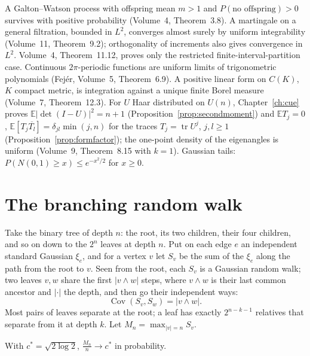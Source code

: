 \begin{reminder}
A Galton--Watson process with offspring mean $m>1$ and $P(\text{no offspring})>0$ survives with positive probability (Volume~4, Theorem~3.8). A martingale on a general filtration, bounded in $L^2$, converges almost surely by uniform integrability (Volume~11, Theorem~9.2); orthogonality of increments also gives convergence in $L^2$. Volume~4, Theorem~11.12, proves only the restricted finite-interval-partition case.
Continuous $2\pi$-periodic functions are uniform limits of trigonometric polynomials (Fej\'er, Volume~5, Theorem~6.9). A positive linear form on $C(K)$, $K$ compact metric, is integration against a unique finite Borel measure
(Volume~7, Theorem~12.3). For $U$ Haar distributed on $U(n)$, Chapter~\ref{ch:cue} proves $\mathbb E|\det(I-U)|^2=n+1$ (Proposition~\ref{prop:secondmoment}) and $\mathbb ET_j=0$, $\mathbb E[T_j\overline{T_l}]=\delta_{jl}\min(j,n)$ for the traces $T_j=\operatorname{tr}U^j$, $j,l\ge1$ (Proposition~\ref{prop:formfactor}); the one-point density of the eigenangles is uniform (Volume~9, Theorem~8.15 with $k=1$). Gaussian tails: $P(N(0,1)\ge x)\le e^{-x^2/2}$ for $x\ge0$.
\end{reminder}

\section{The branching random walk}

Take the binary tree of depth $n$: the root, its two children, their four children, and so on down to the $2^n$ leaves at depth $n$. Put on each edge $e$ an independent standard Gaussian $\xi_e$, and for a vertex $v$ let $S_v$ be the sum
of the $\xi_e$ along the path from the root to $v$. Seen from the root, each $S_v$ is a Gaussian random walk; two leaves $v,w$ share the first $|v\wedge w|$ steps, where $v\wedge w$ is their last common ancestor and $|\cdot|$ the depth, and then
go their independent ways:
\[
\operatorname{Cov}(S_v,S_w)=|v\wedge w|.
\]
Most pairs of leaves separate at the root; a leaf has exactly $2^{n-k-1}$ relatives that separate from it at depth $k$. Let $M_n=\max_{|v|=n}S_v$.

\begin{theorem}\label{thm:brwspeed}
With $c^*=\sqrt{2\log2}$, $\frac{M_n}n\to c^*$ in probability.
\end{theorem}

